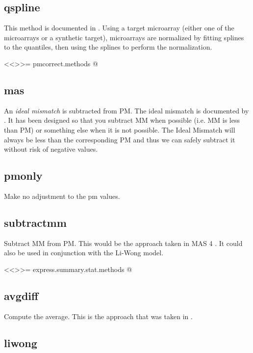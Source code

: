 \subsection{qspline}
This method is documented in \cite{workman:etal:2002}. Using a target microarray (either one of the microarrays or a synthetic target), microarrays are normalized by fitting splines to the quantiles, then using the splines to perform the normalization.

<<>>=
pmcorrect.methods
@
\subsection{mas}

An \emph{ideal mismatch} is subtracted from PM. The ideal mismatch is documented by \cite{affy:tech:2002}. It has been designed so that you subtract MM when possible (i.e. MM is less than PM) or something else when it is not possible. The Ideal Mismatch will always be less than the corresponding PM and thus we can safely subtract it without risk of negative values.

\subsection{pmonly}

Make no adjustment to the pm values.

\subsection{subtractmm}

Subtract MM from PM. This would be the approach taken in MAS 4 \cite{affy4}. It could also be used in conjunction with the Li-Wong model.

<<>>=
express.summary.stat.methods
@

\subsection{avgdiff}

Compute the average. This is the approach that was taken in \cite{affy4}.

\subsection{liwong}

